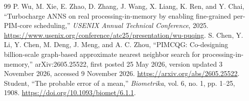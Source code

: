 \begin{thebibliography}{99}
 P. Wu, M. Xie, E. Zhao, D. Zhang, J. Wang, X. Liang, K. Ren, and Y. Chai, ``Turbocharge ANNS on real processing-in-memory by enabling fine-grained per-PIM-core scheduling,'' \emph{USENIX Annual Technical Conference}, 2025. \url{https://www.usenix.org/conference/atc25/presentation/wu-puqing}.
 S. Chen, Y. Li, Y. Chen, M. Deng, J. Meng, and A. C. Zhou, ``PIMCQG: Co-designing billion-scale graph-based approximate nearest neighbor search for processing-in-memory,'' arXiv:2605.25522, first posted 25 May 2026, version updated 3 November 2026, accessed 9 November 2026. \url{https://arxiv.org/abs/2605.25522}.
 Student, ``The probable error of a mean,'' \emph{Biometrika}, vol. 6, no. 1, pp. 1--25, 1908. \url{https://doi.org/10.1093/biomet/6.1.1}.
\end{thebibliography}
